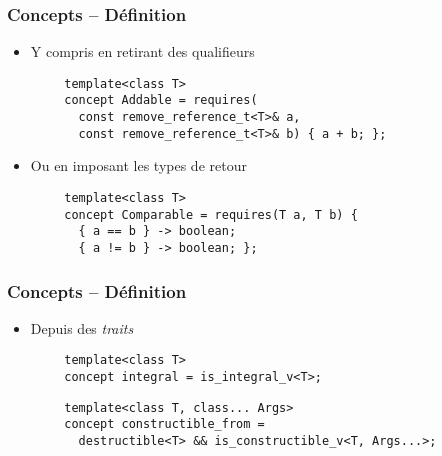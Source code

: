 \documentclass[C++.tex]{subfiles}
\begin{document}
\begin{frame}[fragile]
	\frametitle{Concepts -- Définition}
	\begin{itemize}
		\item Y compris en retirant des qualifieurs
	\end{itemize}

	\begin{verbatim}
		template<class T>
		concept Addable = requires(
		  const remove_reference_t<T>& a,
		  const remove_reference_t<T>& b) { a + b; };
  	\end{verbatim}

	\begin{itemize}
		\item Ou en imposant les types de retour
	\end{itemize}

	\begin{verbatim}
		template<class T>
		concept Comparable = requires(T a, T b) {
		  { a == b } -> boolean;
		  { a != b } -> boolean; };
	\end{verbatim}
\end{frame}

\begin{frame}[fragile]
	\frametitle{Concepts -- Définition}
	\begin{itemize}
		\item Depuis des \textit{traits}
	\end{itemize}

	\begin{verbatim}
		template<class T>
		concept integral = is_integral_v<T>;
	\end{verbatim}

	\begin{verbatim}
		template<class T, class... Args>
		concept constructible_from =
		  destructible<T> && is_constructible_v<T, Args...>;
  	\end{verbatim}
\end{frame}
\end{document}
